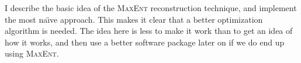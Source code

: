 \documentclass[../notebook.tex]{subfiles}
\begin{document}

I describe the basic idea of the \textsc{MaxEnt} reconstruction technique, and
implement the most na{\"\i}ve approach. This makes it clear that a better
optimization algorithm is needed. The idea here is less to make it work than to
get an idea of how it works, and then use a better software package later on if
we do end up using \textsc{MaxEnt}.


\end{document}
